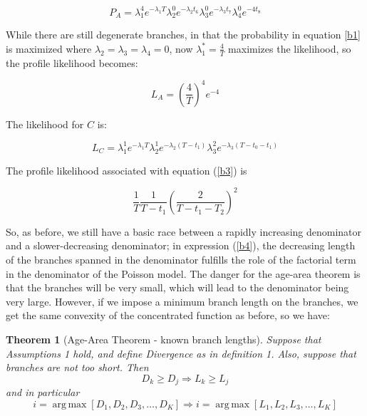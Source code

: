\documentclass[11pt]{article}
\newtheorem{theorem}{Theorem}
\DeclareMathOperator*{\argmax}{arg\,max}
\begin{document}
\begin{equation} \label{b1}
P_A = \lambda_1^4e^{-\lambda_1T}\lambda_2^0e^{-\lambda_2t_6}\lambda_3^0e^{-\lambda_3t_7}\lambda_4 ^0e^{-4t_8}
\end{equation} 

While there are still degenerate branches, in that the probability in equation \ref{b1} is maximized where $\lambda_2=\lambda_3=\lambda_4=0$, now $\lambda_1^*=\frac{4}{T}$ maximizes the likelihood, so the profile likelihood becomes:

\begin{equation} \label{b2}
L_A=\left(\frac{4}{T}\right)^4e^{-4}
\end{equation}

The likelihood for $C$ is:

\begin{equation} \label{b3}
L_{C}=\lambda_1^1e^{-\lambda_1T}\lambda_2^1e^{-\lambda_2(T-t_1)}
\lambda_3^2e^{-\lambda_3(T-t_0-t_1)}
\end{equation}

The profile likelihood associated with equation (\ref{b3}) is 

\begin{equation} \label{b4}
\frac{1}{T}\frac{1}{T-t_1}\left(\frac{2}{T-t_1-T_2}\right)^2
\end{equation}

So, as before, we still have a basic race between a rapidly increasing denominator and a slower-decreasing denominator; in expression (\ref{b4}), the decreasing length of the branches spanned in the denominator fulfills the role of the factorial term in the denominator of the Poisson model. The danger for the age-area theorem is that the branches will be very small, which will lead to the denominator being very large. However, if we impose a minimum branch length on the branches, we get the same convexity of the concentrated function as before, so we have:

\begin{theorem}[Age-Area Theorem  - known branch lengths]
Suppose that Assumptions 1 hold, and define Divergence as in definition 1. Also, suppose that branches are not too short.  Then  
\begin{equation*}
D_k \geq D_j \Longrightarrow L_k\geq L_j
\end{equation*}
and in particular
\begin{equation*}
i=\argmax\left[D_1,D_2,D_3,\hdots,D_{K}\right] \Longrightarrow i=\argmax\left[L_1,L_2,L_3,\hdots,L_K\right]
\end{equation*}
\end{theorem}
\end{document}

